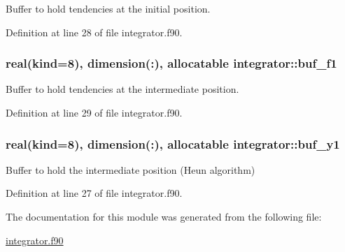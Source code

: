 Buffer to hold tendencies at the initial position. 



Definition at line 28 of file integrator.\-f90.

\hypertarget{classintegrator_acabd8820aca8c50aac234c5d404493b4}{
\subsubsection[{buf\-\_\-f1}]{\setlength{\rightskip}{0pt plus 5cm}real(kind=8), dimension(\-:), allocatable integrator\-::buf\-\_\-f1\hspace{0.3cm}{\ttfamily [private]}}}\label{classintegrator_acabd8820aca8c50aac234c5d404493b4}


Buffer to hold tendencies at the intermediate position. 



Definition at line 29 of file integrator.\-f90.

\hypertarget{classintegrator_ad82fcb5f12f76e9009ccd172f2ffa6b0}{
\subsubsection[{buf\-\_\-y1}]{\setlength{\rightskip}{0pt plus 5cm}real(kind=8), dimension(\-:), allocatable integrator\-::buf\-\_\-y1\hspace{0.3cm}{\ttfamily [private]}}}\label{classintegrator_ad82fcb5f12f76e9009ccd172f2ffa6b0}


Buffer to hold the intermediate position (Heun algorithm) 



Definition at line 27 of file integrator.\-f90.



The documentation for this module was generated from the following file\-:\begin{DoxyCompactItemize}
\item 
\hyperlink{integrator_8f90}{integrator.\-f90}\end{DoxyCompactItemize}
